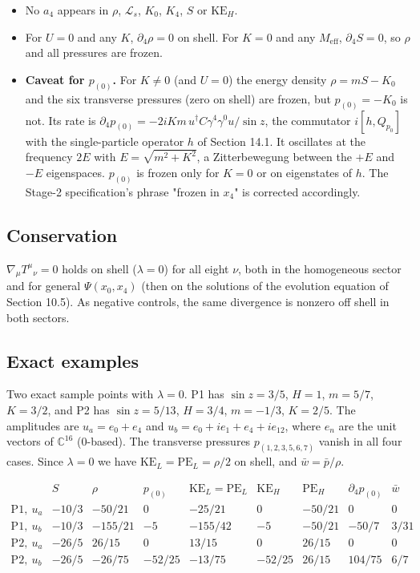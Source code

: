 \documentclass[11pt]{article}
\begin{document}
\begin{itemize}
\item No $a_4$ appears in $\rho$, $\mathcal L_s$, $K_0$, $K_4$, $S$ or $\mathrm{KE}_H$.
\item For $U=0$ and any $K$, $\partial_4\rho=0$ on shell. For $K=0$ and any $M_{\mathrm{eff}}$, $\partial_4S=0$, so $\rho$ and all pressures are frozen.
\item \textbf{Caveat for $p_{(0)}$.} For $K\ne0$ (and $U=0$) the energy density $\rho=mS-K_0$ and the six transverse pressures (zero on shell) are frozen, but $p_{(0)}=-K_0$ is not. Its rate is $\partial_4p_{(0)}=-2iKm\,u^\dagger C\gamma^4\gamma^0u/\sin z$, the commutator $i[h,Q_{p_0}]$ with the single-particle operator $h$ of Section 14.1. It oscillates at the frequency $2E$ with $E=\sqrt{m^2+K^2}$, a Zitterbewegung between the $+E$ and $-E$ eigenspaces. $p_{(0)}$ is frozen only for $K=0$ or on eigenstates of $h$. The Stage-2 specification's phrase "frozen in $x_4$" is corrected accordingly.
\end{itemize}

\subsection{Conservation}

$\nabla_\mu T^\mu{}_\nu=0$ holds on shell ($\lambda=0$) for all eight $\nu$, both in the homogeneous sector and for general $\Psi(x_0,x_4)$ (then on the solutions of the evolution equation of Section 10.5). As negative controls, the same divergence is nonzero off shell in both sectors.

\subsection{Exact examples}

Two exact sample points with $\lambda=0$. P1 has $\sin z=3/5$, $H=1$, $m=5/7$, $K=3/2$, and P2 has $\sin z=5/13$, $H=3/4$, $m=-1/3$, $K=2/5$. The amplitudes are $u_a=e_0+e_4$ and $u_b=e_0+ie_1+e_4+ie_{12}$, where $e_n$ are the unit vectors of $\mathbb C^{16}$ (0-based). The transverse pressures $p_{(1,2,3,5,6,7)}$ vanish in all four cases. Since $\lambda=0$ we have $\mathrm{KE}_L=\mathrm{PE}_L=\rho/2$ on shell, and $\bar w=\bar p/\rho$.

\[
\begin{array}{l|rrrrrrrr}
 & S & \rho & p_{(0)} & \mathrm{KE}_L=\mathrm{PE}_L & \mathrm{KE}_H & \mathrm{PE}_H & \partial_4p_{(0)} & \bar w \\ \hline
\text{P1},\ u_a & -10/3 & -50/21 & 0 & -25/21 & 0 & -50/21 & 0 & 0 \\
\text{P1},\ u_b & -10/3 & -155/21 & -5 & -155/42 & -5 & -50/21 & -50/7 & 3/31 \\
\text{P2},\ u_a & -26/5 & 26/15 & 0 & 13/15 & 0 & 26/15 & 0 & 0 \\
\text{P2},\ u_b & -26/5 & -26/75 & -52/25 & -13/75 & -52/25 & 26/15 & 104/75 & 6/7
\end{array}
\]
\end{document}

